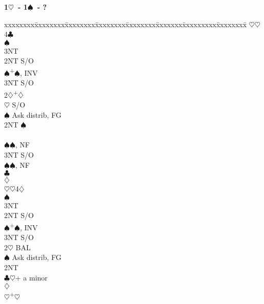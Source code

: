 \documentclass[10pt]{article}
\renewcommand{\c}{$\clubsuit$}
\renewcommand{\d}{$\diamondsuit$}
\newcommand{\h}{$\heartsuit$}
\newcommand{\s}{$\spadesuit$}
\newcommand{\p}{\textsuperscript{+}}
\newenvironment{bidtable}[1][]
{\textbf{#1}
  \begin{adjustwidth}{1em}{}
    \addvspace{2pt}
    \begin{tabbing}
      xxxxxxxx\=xxxxxxxx\=xxxxxxxx\=xxxxxxxx\=xxxxxxxx\=xxxxxxx\=xxxxxxxxx\=xxxxxxxx\=\kill}
{\end{tabbing}\end{adjustwidth}\bigskip}%
\begin{document}
\begin{bidtable}[1\h\ - 1\s\ - ?]
    \>      \h {}\h 4\c                       \\
    \>      \s {}                          \\
    \>      \> 3NT                           \\
    \> 2NT  \> S/O                                  \\
    \s  {}\p\s, INV                           \\
    \> 3NT  \> S/O                                  \\
2\d {}\p\d                                        \\
    \h  \> S/O                                  \\
    \s  \> Ask distrib, FG                      \\
    \>      \> 2NT \s                           \\
    \>      \>     \>     \>                        \\
    \>      \>     \s {}\s, NF                \\
    \>      \>     \> 3NT \> S/O                    \\
    \>      \>     \s {}\s, NF                \\
    \>      \c {}                          \\
    \>      \d {}                          \\
    \>      \h {}\h 4\d                       \\
    \>      \s {}                          \\
    \>      \> 3NT                           \\
    \> 2NT  \> S/O                                  \\
    \s  {}\p\s, INV                           \\
    \> 3NT  \> S/O                                  \\
2\h \> BAL                                          \\
    \s  \> Ask distrib, FG                      \\
    \>      \> 2NT                           \\
    \>      \c {}\h + a minor                 \\
    \>      \d {}                          \\
    \>      \h {}\p\h                         \\

\end{bidtable}
\end{document}
